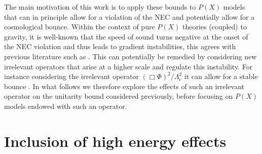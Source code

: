\documentclass[12pt]{article}
\begin{document}
The main motivation of this work is to apply these bounds to $P(X)$ models that can in principle allow for a violation of the NEC and potentially allow for a cosmological bounce. Within the context of pure $P(X)$ theories (coupled) to gravity, it is well-known that the speed of sound turns negative at the onset of the NEC violation and thus leads to gradient instabilities, this agrees with previous literature such as \cite{Vikman:2004dc,Easson:2016klq}. This can potentially be remedied by considering new irrelevant operators that arise at a higher scale and regulate this instability. For instance considering the irrelevant operator $(\Box \Phi)^2/\Lambda_c^2$ it can allow for a stable bounce \cite{Creminelli:2006xe, Buchbinder:2007ad}. In what follows we therefore explore the effects of such an irrelevant operator on the unitarity bound considered previously, before focusing on $P(X)$ models endowed with such an operator.

\section{Inclusion of high energy effects}
\label{sec:HighEnergy}
\end{document}
